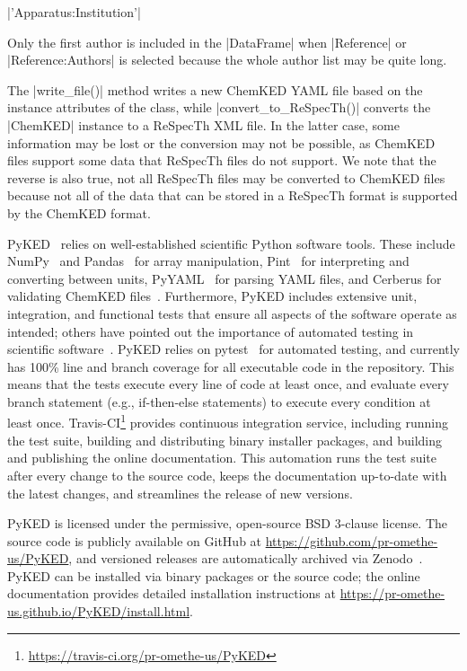 \documentclass[12pt]{ijck}
\newcommand\ck{ChemKED}
\newcommand\pk{PyKED}
\begin{document}
\noindent\begin{itemize*}
    \item \pybox|'Apparatus:Institution'|
\end{itemize*}

Only the first author is included in the \pybox|DataFrame| when \pybox|Reference| or
\pybox|Reference:Authors| is selected because the whole author list may be
quite long.

The \pybox|write_file()| method writes a new \ck{} YAML file based on the instance attributes
of the class, while \pybox|convert_to_ReSpecTh()| converts the \pybox|ChemKED|
instance to a ReSpecTh XML file. In the latter case, some information may be lost or the conversion
may not be possible, as \ck{} files support some data that ReSpecTh files do not support. We note
that the reverse is also true, not all ReSpecTh files may be converted to \ck{} files because not
all of the data that can be stored in a ReSpecTh format is supported by the \ck{} format.

\pk{}~\autocite{PyKED} relies on well-established scientific Python software tools.
These include NumPy~\autocite{vanderWalt:2011np} and Pandas~\autocite{pandas,McKinney2010}
for array manipulation, Pint~\autocite{Grecco2016} for interpreting and converting
between units, PyYAML~\autocite{pyyaml} for parsing YAML
files, and Cerberus for validating \ck{} files~\autocite{cerberus}.
Furthermore, \pk{} includes extensive unit, integration, and functional tests
that ensure all aspects of the software operate as intended; others have pointed
out the importance of automated testing in scientific software~\autocite{Wilson:bestpractices}.
\pk{} relies on pytest~\autocite{pytest:3.0.1} for automated testing, and currently has
100\% line and branch coverage for all executable code in the repository. This
means that the tests execute every line of code at least once, and evaluate
every branch statement (e.g., if-then-else statements) to execute every condition
at least once.
Travis-CI\footnote{\url{https://travis-ci.org/pr-omethe-us/PyKED}} provides continuous
integration service, including running the test suite, building and distributing binary
installer packages, and building and publishing the online documentation. This automation
runs the test suite after every change to the source code, keeps the documentation
up-to-date with the latest changes, and streamlines the release of new versions.

\pk{} is licensed under the permissive, open-source BSD 3-clause license. The
source code is publicly available on GitHub at \url{https://github.com/pr-omethe-us/PyKED},
and versioned releases are automatically archived via Zenodo~\autocite{PyKED}.
\pk{} can be installed via binary packages or the source code; the online documentation
provides detailed installation instructions at
\url{https://pr-omethe-us.github.io/PyKED/install.html}.
\end{document}
